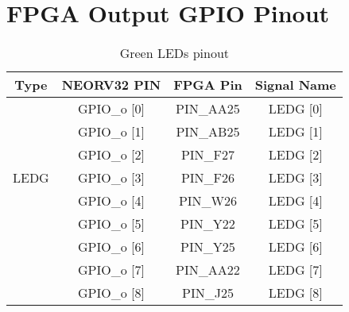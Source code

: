 %
%
%
%
%


\chapter{FPGA Output GPIO Pinout}

\begin{table}[!htb]\scriptsize
    \centering
    \begin{tabular}{c c c c}
        \toprule[1.5pt]
        \textbf{Type} & \quad \quad \textbf{NEORV32 PIN} & \quad \quad \textbf{FPGA Pin} & \quad \quad \textbf{Signal Name}  \\
          
        \midrule
               & \quad \quad GPIO\_o [0] & \quad \quad PIN\_AA25 & \quad \quad LEDG [0]\\
               & \quad \quad GPIO\_o [1] & \quad \quad PIN\_AB25 & \quad \quad LEDG [1]\\
               & \quad \quad GPIO\_o [2] & \quad \quad PIN\_F27  & \quad \quad LEDG [2]\\
        LEDG   & \quad \quad GPIO\_o [3] & \quad \quad PIN\_F26  & \quad \quad LEDG [3]\\        
               & \quad \quad GPIO\_o [4] & \quad \quad PIN\_W26  & \quad \quad LEDG [4]\\
               & \quad \quad GPIO\_o [5] & \quad \quad PIN\_Y22  & \quad \quad LEDG [5]\\
               & \quad \quad GPIO\_o [6] & \quad \quad PIN\_Y25  & \quad \quad LEDG [6]\\
               & \quad \quad GPIO\_o [7] & \quad \quad PIN\_AA22 & \quad \quad LEDG [7]\\
               & \quad \quad GPIO\_o [8] & \quad \quad PIN\_J25  & \quad \quad LEDG [8]\\
            \bottomrule[1.5pt]
         
    \end{tabular}
    \caption{\label{tab:ledg_o} Green LEDs pinout}
\end{table}


